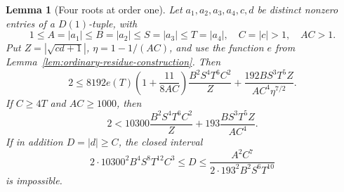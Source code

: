 \documentclass[12pt]{article}
\newtheorem{lemma}[theorem]{Lemma}
\numberwithin{equation}{section}
\begin{document}
\begin{lemma}[Four roots at order one]\label{sm:lem-four-root-k1}
Let \(a_1,a_2,a_3,a_4,c,d\) be distinct nonzero entries of a
\(D(1)\)-tuple, with
\[
 1\le A=|a_1|\le B=|a_2|\le S=|a_3|\le T=|a_4|,
 \quad C=|c|>1,\quad AC>1.
\]
Put \(Z=|\sqrt{cd+1}|\), \(\eta=1-1/(AC)\), and use the function
\(e\) from Lemma~\ref{lem:ordinary-residue-construction}. Then
\begin{equation}
 2\le8192e(T)\left(1+\frac{11}{8AC}\right)
       \frac{B^2S^4T^6C^2}{Z}
       +\frac{192BS^3T^5Z}{AC^4\eta^{7/2}}.
 \label{sm:eq-four-root-exact}
\end{equation}
If \(C\ge4T\) and \(AC\ge1000\), then
\begin{equation}
 2<10300\frac{B^2S^4T^6C^2}{Z}
       +193\frac{BS^3T^5Z}{AC^4}.
 \label{sm:eq-four-root-safe}
\end{equation}
If in addition \(D=|d|\ge C\), the closed interval
\begin{equation}\label{sm:eq-four-root-window}
 2\cdot10300^2B^4S^8T^{12}C^3\le D
 \le\frac{A^2C^7}{2\cdot193^2B^2S^6T^{10}}
\end{equation}
is impossible.
\end{lemma}
\end{document}
